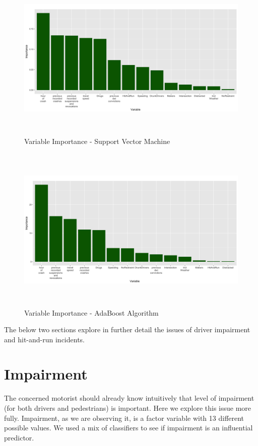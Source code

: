 \documentclass[11pt, oneside,titlepage]{article}   	%
\begin{document}
\begin{figure}[H]
\centering
  \includegraphics[width=15cm,height=8cm,keepaspectratio]{ImportancePlot_SVM.png}
\caption{Variable Importance - Support Vector Machine}
\end{figure}

\begin{figure}[H]
\centering
  \includegraphics[width=15cm,height=8cm,keepaspectratio]{ImportancePlot_ADABoost.png}
\caption{Variable Importance - AdaBoost Algorithm}
\end{figure}

The below two sections explore in further detail the issues of driver impairment and hit-and-run incidents.

\section*{Impairment}

The concerned motorist should already know intuitively that level of impairment (for both drivers and pedestrians) is important. Here we explore this issue more fully. Impairment, as we are observing it, is a factor variable with 13 different possible values. We used a mix of classifiers to see if impairment is an influential predictor.
\end{document}
